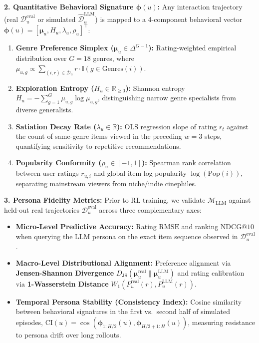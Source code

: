 \documentclass{article}
\begin{document}
\textbf{2. Quantitative Behavioral Signature $\bm{\phi}(u)$:} Any interaction trajectory (real $\mathcal{D}_{u}^{\text{eval}}$ or simulated $\hat{\mathcal{D}}_{u}^{\text{LLM}}$) is mapped to a 4-component behavioral vector $\bm{\phi}(u) = [\bm{\mu}_u, H_u, \lambda_u, \rho_u]^\top$:
\begin{enumerate}
    \item \textbf{Genre Preference Simplex ($\bm{\mu}_u \in \Delta^{G-1}$):} Rating-weighted empirical distribution over $G=18$ genres, where $\mu_{u,g} \propto \sum_{(i, r) \in \mathcal{D}_u} r \cdot \mathbb{I}(g \in \text{Genres}(i))$.
    \item \textbf{Exploration Entropy ($H_u \in \mathbb{R}_{\ge 0}$):} Shannon entropy $H_u = -\sum_{g=1}^G \mu_{u,g} \log \mu_{u,g}$, distinguishing narrow genre specialists from diverse generalists.
    \item \textbf{Satiation Decay Rate ($\lambda_u \in \mathbb{R}$):} OLS regression slope of rating $r_t$ against the count of same-genre items viewed in the preceding $w=3$ steps, quantifying sensitivity to repetitive recommendations.
    \item \textbf{Popularity Conformity ($\rho_u \in [-1, 1]$):} Spearman rank correlation between user ratings $r_{u,i}$ and global item log-popularity $\log(\text{Pop}(i))$, separating mainstream viewers from niche/indie cinephiles.
\end{enumerate}

\textbf{3. Persona Fidelity Metrics:} Prior to RL training, we validate $\mathcal{M}_{\text{LLM}}$ against held-out real trajectories $\mathcal{D}_u^{\text{eval}}$ across three complementary axes:
\begin{itemize}
    \item \textbf{Micro-Level Predictive Accuracy:} Rating $\text{RMSE}$ and ranking $\text{NDCG@10}$ when querying the LLM persona on the exact item sequence observed in $\mathcal{D}_u^{\text{eval}}$.
    \item \textbf{Macro-Level Distributional Alignment:} Preference alignment via \textbf{Jensen-Shannon Divergence} $D_{\text{JS}}(\bm{\mu}_u^{\text{real}} \parallel \bm{\mu}_u^{\text{LLM}})$ and rating calibration via \textbf{1-Wasserstein Distance} $W_1(P_u^{\text{real}}(r), P_u^{\text{LLM}}(r))$.
    \item \textbf{Temporal Persona Stability (Consistency Index):} Cosine similarity between behavioral signatures in the first vs.\ second half of simulated episodes, $\text{CI}(u) = \cos(\bm{\phi}_{1:H/2}(u), \bm{\phi}_{H/2+1:H}(u))$, measuring resistance to persona drift over long rollouts.
\end{itemize}
\end{document}
